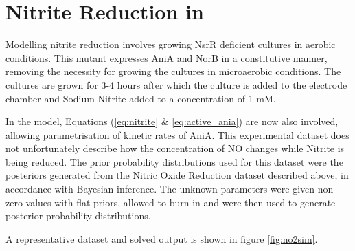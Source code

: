 \chapter{Nitrite Reduction in \Nm{}}
\label{chap:nitritereduction}

Modelling nitrite reduction involves growing NsrR deficient cultures in aerobic conditions. This mutant expresses AniA and NorB in a constitutive manner, removing the necessity for growing the cultures in microaerobic conditions. The cultures are grown for 3-4 hours after which the culture is added to the electrode chamber and Sodium Nitrite added to a concentration of 1 mM.

In the model, Equations (\ref{eq:nitrite} \& \ref{eq:active_ania}) are now also involved, allowing parametrisation of kinetic rates of AniA. This experimental dataset does not unfortunately describe how the concentration of NO changes while Nitrite is being reduced. The prior probability distributions used for this dataset were the posteriors generated from the Nitric Oxide Reduction dataset described above, in accordance with Bayesian inference. The unknown parameters were given non-zero values with flat priors, allowed to burn-in and were then used to generate posterior probability distributions.

A representative dataset and solved output is shown in figure \ref{fig:no2sim}. 


